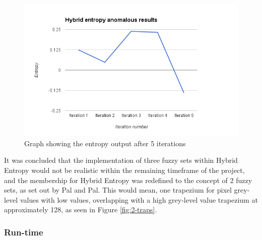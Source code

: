 \begin{figure}[!ht]
  \centering
  \includegraphics[scale=0.5]{Chapter2/hybrid-img/minus-entropy.png}
  \caption{Graph showing the entropy output after 5 iterations}
  \label{fig:minus-entropy}
\end{figure}

It was concluded that the implementation of three fuzzy sets within Hybrid Entropy would not be realistic within the remaining timeframe of the project, and the membership for Hybrid Entropy was redefined to the concept of 2 fuzzy sets, as set out by Pal and Pal. This would mean, one trapezium for pixel grey-level values with low values, overlapping with a high grey-level value trapezium at approximately 128, as seen in Figure \ref{fig:2-traps}.

\subsubsection{Run-time}
